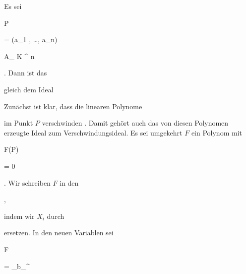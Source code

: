 {


Es sei


\mavergleichskette


{\vergleichskette


{ P
}


{ = }{ (a_1 , \ldots , a_n)
}


{ \in }{ { {\mathbb A}_{  K }^{  n   } }
}


{    }{
}


{   }{
}


}
{}{}{.}
Dann ist das


 gleich dem Ideal


 Zunächst ist klar, dass die linearen Polynome


 im Punkt $P$ verschwinden
 {} {.}
Damit gehört auch das von diesen Polynomen erzeugte Ideal zum Verschwindungsideal. Es sei umgekehrt $F$ ein Polynom mit


\mavergleichskette


{\vergleichskette


{ F(P)
}


{ = }{ 0
}


{  }{
}


{    }{
}


{   }{
}


}
{}{}{.}
Wir schreiben $F$ in den 


 { , }


indem wir $X_i$ durch


 ersetzen. In den neuen Variablen sei


\mavergleichskette


{\vergleichskette


{ F
}


{ = }{ \sum_\nu b_\nu {}^\nu
}


{  }{
}


}}
